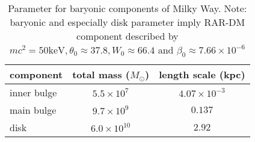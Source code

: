 \begin{table}
  \centering
  \begin{tabular}{@{}lcc@{}}
  \toprule
  component & total mass ($M_\odot$) & length scale (kpc) \\ \midrule
  inner bulge    & $5.5 \times 10^7$      & $4.07 \times 10^{-3}$\\
  main bulge     & $9.7 \times 10^9$      & $0.137$             \\
  disk           & $6.0 \times 10^{10}$   & $2.92$              \\ \bottomrule
  \end{tabular}
	\caption{Parameter for baryonic components of Milky Way. Note: baryonic and especially disk parameter imply RAR-DM component described by $mc^2=50 \mathrm{keV}, \theta_0 \approx 37.8, W_0 \approx 66.4$ and $\beta_0 \approx 7.66 \times 10^{-6}$}
  \label{tbl:mw:parameter}
\end{table}